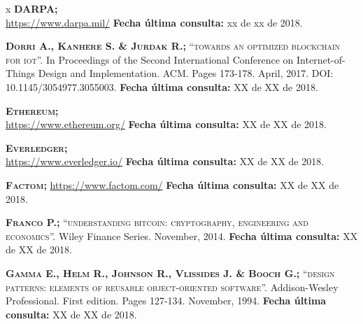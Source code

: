 \begin{thebibliography} {x}
	 \textsc{\textbf{DARPA; }} \\ 
	\url{https://www.darpa.mil/}
	\newline \textbf{Fecha última consulta:} xx de xx de 2018.
		
	 \textsc{\textbf{Dorri A., Kanhere S. \& Jurdak R.; }}\textsc{“towards an optimized blockchain for iot”.} In Proceedings of the Second International Conference on Internet-of-Things Design and Implementation. ACM. Pages 173-178. April, 2017. DOI: 10.1145/3054977.3055003.
	\newline \textbf{Fecha última consulta:} {\color{red}XX de XX de 2018.}
		
	 \textsc{\textbf{Ethereum; }} \\
	\url{https://www.ethereum.org/}
	\newline \textbf{Fecha última consulta:} XX de XX de 2018.
	
	 \textsc{\textbf{Everledger; }} \\
	\url{https://www.everledger.io/}
	\newline \textbf{Fecha última consulta:} XX de XX de 2018.
		
	 \textsc{\textbf{Factom; }} 
	\url{https://www.factom.com/}
	\newline \textbf{Fecha última consulta:} XX de XX de 2018.
			
	 \textsc{\textbf{Franco P.; }}\textsc{“understanding bitcoin: cryptography, engineering and economics”.} Wiley Finance Series. November, 2014. 
	\newline \textbf{Fecha última consulta:} {\color{red}XX de XX de 2018.}
		
		
		
	 \textsc{\textbf{Gamma E., Helm R., Johnson R., Vlissides J. \& Booch G.; }}\textsc{“design patterns: elements of reusable object-oriented software”.} Addison-Wesley Professional. First edition. Pages 127-134. November, 1994.
	\newline \textbf{Fecha última consulta:} XX de XX de 2018.
		

\end{thebibliography}
